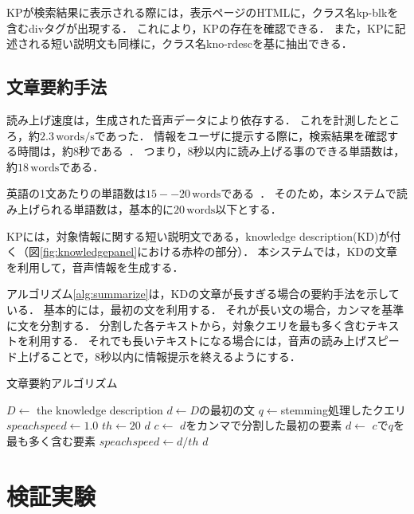 \documentclass[pdflatex,ja=standard]{bxjsarticle}
\begin{document}
KPが検索結果に表示される際には，表示ページのHTMLに，クラス名{\rm kp-blk}を含むdivタグが出現する．
これにより，KPの存在を確認できる．
また，KPに記述される短い説明文も同様に，クラス名{\rm kno-rdesc}を基に抽出できる．

\subsection{文章要約手法} \label{sec:summarize}

読み上げ速度は，生成された音声データにより依存する．
これを計測したところ，約$2.3\,\mathrm{words/s}$であった．
情報をユーザに提示する際に，検索結果を確認する時間は，約8秒である~\cite{Granka2004}．
つまり，8秒以内に読み上げる事のできる単語数は，約$18\,\mathrm{words}$である．

英語の1文あたりの単語数は$15--20\,\mathrm{words}$である~\cite{Mesa}．
そのため，本システムで読み上げられる単語数は，基本的に$20\,\mathrm{words}$以下とする．

KPには，対象情報に関する短い説明文である，{\rm knowledge description}(KD)が付く（図\ref{fig:knowledgepanel}における赤枠の部分）．
本システムでは，KDの文章を利用して，音声情報を生成する．

アルゴリズム\ref{alg:summarize}は，KDの文章が長すぎる場合の要約手法を示している．
基本的には，最初の文を利用する．
それが長い文の場合，カンマを基準に文を分割する．
分割した各テキストから，対象クエリを最も多く含むテキストを利用する．
それでも長いテキストになる場合には，音声の読み上げスピード上げることで，8秒以内に情報提示を終えるようにする．

\begin{algorithm}
\caption{文章要約アルゴリズム}
\label{alg:summarize}
\begin{algorithmic}
    \STATE $D \leftarrow$ the knowledge description
    \STATE $d \leftarrow D$の最初の文
    \STATE $q \leftarrow $stemming処理したクエリ
    \STATE $speachspeed \leftarrow 1.0$
    \STATE $th \leftarrow 20$
        \RETURN $d$
    \ELSE
        \STATE $c \leftarrow$ $d$をカンマで分割した最初の要素
        \STATE $d \leftarrow$ $c$で$q$を最も多く含む要素
            \STATE $speachspeed \leftarrow d / th$
        \RETURN $d$
        \ENDIF
    \ENDIF
\end{algorithmic}
\end{algorithm}


\section{検証実験}
\end{document}
